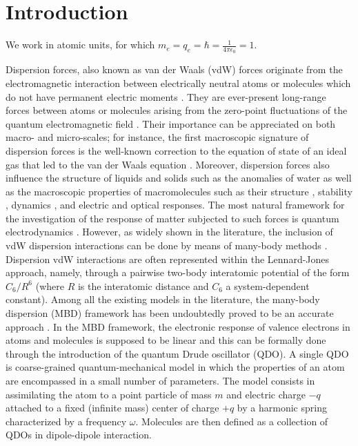 \documentclass[reprint, amsmath, amssymb, aps]{revtex4-2}
\begin{document}
\section{Introduction}

    We work in atomic units, for which $m_e=q_e=\hbar=\frac{1}{4\pi\epsilon_0}=1$.

    Dispersion forces, also known as van der Waals (vdW) forces originate from the electromagnetic interaction between electrically neutral atoms or molecules which do not have permanent electric moments \cite{margenau2013theory,kaplan2006intermolecular,stone2013theory,hirschfelder2009intermolecular}. They are ever-present long-range forces between atoms or molecules arising from the zero-point fluctuations of the quantum electromagnetic field \cite{casimir1948influence,buhmann2013dispersion,buhmann2007dispersion,compagno1995atom,passante2018dispersion}. Their importance can be appreciated on both macro- and micro-scales; for instance, the first macroscopic signature of dispersion forces is the well-known correction to the equation of state of an ideal gas that led to the van der Waals equation \cite{milonni2013quantum}. Moreover, dispersion forces also influence the structure of liquids and solids such as the anomalies of water \cite{schmid2001recent} as well as the macroscopic properties of macromolecules such as their structure \cite{hoja2019reliable}, stability \cite{hoja2018first,mortazavi2018structure}, dynamics \cite{stohr2019quantum,reilly2014role,galante2021anisotropic}, and electric \cite{kleshchonok2018tailoring} and optical \cite{ambrosetti2022optical} responses. The most natural framework for the investigation of the response of matter subjected to such forces is quantum electrodynamics \cite{cohen1997photons,cohen1998atom,bookpreparata,salam2009molecular,craig1998t}. However, as widely shown in the literature, the inclusion of vdW dispersion interactions can be done by means of many-body methods \cite{richardson1975dispersion,mahanty1973dispersion,woods2016materials,tkatchenko2015current,ren2012random,harl2009accurate,dobson2012calculation,parsegian2005van}. Dispersion vdW interactions are often represented within the Lennard-Jones approach, namely, through a pairwise two-body interatomic potential \cite{becke2006simple,becke2006exchange,grimme2010consistent,grimme2006semiempirical,tkatchenko2012accurate,massa2021many} of the form $C_{6}/R^{6}$ (where $R$ is the interatomic distance and $C_6$ a system-dependent constant). Among all the existing models in the literature, the many-body dispersion (MBD) framework has been undoubtedly proved to be an accurate approach \cite{tkatchenko2012accurate,ambrosetti2014long}. In the MBD framework, the electronic response of valence electrons in atoms and molecules is supposed to be linear and this can be formally done through the introduction of the quantum Drude oscillator (QDO). A single QDO is coarse-grained quantum-mechanical model in which the properties of an atom are encompassed in a small number of parameters. The model consists in assimilating the atom to a point particle of mass $m$ and electric charge $-q$ attached to a fixed (infinite mass) center of charge $+q$ by a harmonic spring characterized by a frequency $\omega$. Molecules are then defined as a collection of QDOs in dipole-dipole interaction.
\end{document}
